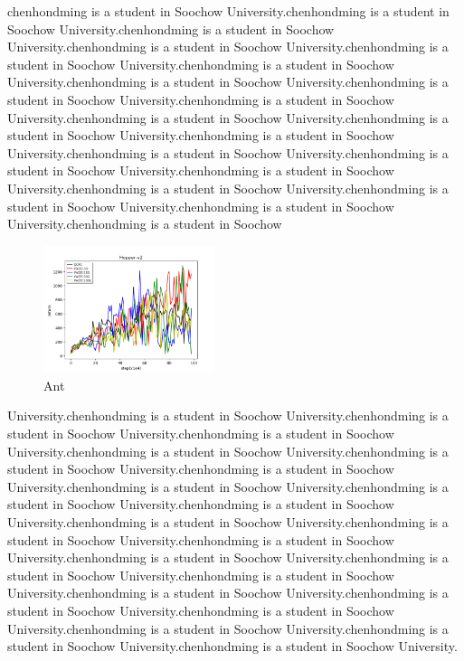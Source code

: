 \documentclass{article}
\begin{document}
chenhondming is a student in Soochow University.chenhondming is a student in Soochow University.chenhondming is a student in Soochow University.chenhondming is a student in Soochow University.chenhondming is a student in Soochow University.chenhondming is a student in Soochow University.chenhondming is a student in Soochow University.chenhondming is a student in Soochow University.chenhondming is a student in Soochow University.chenhondming is a student in Soochow University.chenhondming is a student in Soochow University.chenhondming is a student in Soochow University.chenhondming is a student in Soochow University.chenhondming is a student in Soochow University.chenhondming is a student in Soochow University.chenhondming is a student in Soochow University.chenhondming is a student in Soochow University.chenhondming is a student in Soochow University.chenhondming is a student in Soochow
\begin{figure}[htbp]
  \centering
  \includegraphics[width=5cm]{hopper}
  \caption{Ant}\label{Ant}
\end{figure}


University.chenhondming is a student in Soochow University.chenhondming is a student in Soochow University.chenhondming is a student in Soochow University.chenhondming is a student in Soochow University.chenhondming is a student in Soochow University.chenhondming is a student in Soochow University.chenhondming is a student in Soochow University.chenhondming is a student in Soochow University.chenhondming is a student in Soochow University.chenhondming is a student in Soochow University.chenhondming is a student in Soochow University.chenhondming is a student in Soochow University.chenhondming is a student in Soochow University.chenhondming is a student in Soochow University.chenhondming is a student in Soochow University.chenhondming is a student in Soochow University.chenhondming is a student in Soochow University.chenhondming is a student in Soochow University.chenhondming is a student in Soochow University.chenhondming is a student in Soochow University.chenhondming is a student in Soochow University.
\end{document}
